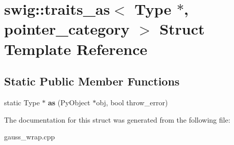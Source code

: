 \hypertarget{structswig_1_1traits__as_3_01_type_01_5_00_01pointer__category_01_4}{\section{swig\-:\-:traits\-\_\-as$<$ Type $\ast$, pointer\-\_\-category $>$ Struct Template Reference}
\label{structswig_1_1traits__as_3_01_type_01_5_00_01pointer__category_01_4}
}
\subsection*{Static Public Member Functions}
\begin{DoxyCompactItemize}
\item 
\hypertarget{structswig_1_1traits__as_3_01_type_01_5_00_01pointer__category_01_4_a7312181fed828608a6a29b4ff622a85f}{static Type $\ast$ {\bfseries as} (Py\-Object $\ast$obj, bool throw\-\_\-error)}\label{structswig_1_1traits__as_3_01_type_01_5_00_01pointer__category_01_4_a7312181fed828608a6a29b4ff622a85f}

\end{DoxyCompactItemize}


The documentation for this struct was generated from the following file\-:\begin{DoxyCompactItemize}
\item 
gauss\-\_\-wrap.\-cpp\end{DoxyCompactItemize}
